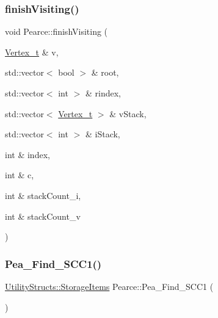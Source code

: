 \mbox{\label{class_pearce_a48afb6ccb75ba9df285c9701daf474b0}} 
\subsubsection{\texorpdfstring{finish\+Visiting()}{finishVisiting()}}
{\footnotesize\ttfamily void Pearce\+::finish\+Visiting (\begin{DoxyParamCaption}\item[{\hyperlink{class_graph_component_ae67114a6ce5a001dc35e1996e1b45aa0}{Vertex\+\_\+t} \&}]{v,  }\item[{std\+::vector$<$ bool $>$ \&}]{root,  }\item[{std\+::vector$<$ int $>$ \&}]{rindex,  }\item[{std\+::vector$<$ \hyperlink{class_graph_component_ae67114a6ce5a001dc35e1996e1b45aa0}{Vertex\+\_\+t} $>$ \&}]{v\+Stack,  }\item[{std\+::vector$<$ int $>$ \&}]{i\+Stack,  }\item[{int \&}]{index,  }\item[{int \&}]{c,  }\item[{int \&}]{stack\+Count\+\_\+i,  }\item[{int \&}]{stack\+Count\+\_\+v }\end{DoxyParamCaption})}

\mbox{\label{class_pearce_a4a78c1ec037146537f575fa62b1e0265}} 
\subsubsection{\texorpdfstring{Pea\+\_\+\+Find\+\_\+\+S\+C\+C1()}{Pea\_Find\_SCC1()}}
{\footnotesize\ttfamily \hyperlink{struct_utility_structs_1_1_storage_items}{Utility\+Structs\+::\+Storage\+Items} Pearce\+::\+Pea\+\_\+\+Find\+\_\+\+S\+C\+C1 (\begin{DoxyParamCaption}{ }\end{DoxyParamCaption})}

\mbox{\label{class_pearce_a4764238b69ee587134a9009619a4cae5}} 
